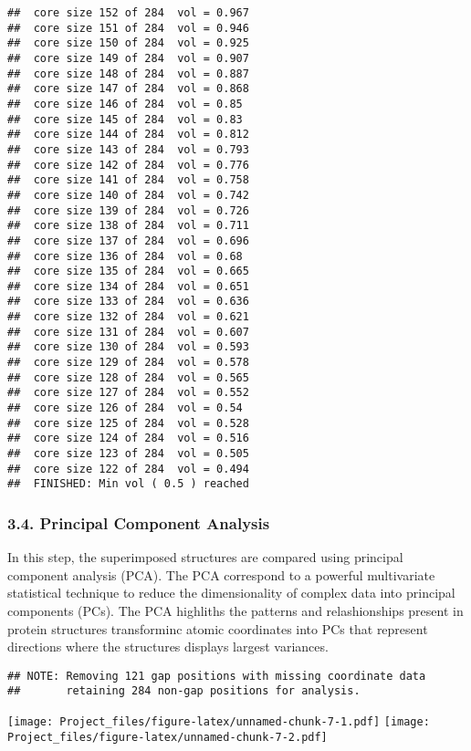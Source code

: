 \documentclass[
]{article}
\begin{document}
\begin{verbatim}
##  core size 152 of 284  vol = 0.967 
##  core size 151 of 284  vol = 0.946 
##  core size 150 of 284  vol = 0.925 
##  core size 149 of 284  vol = 0.907 
##  core size 148 of 284  vol = 0.887 
##  core size 147 of 284  vol = 0.868 
##  core size 146 of 284  vol = 0.85 
##  core size 145 of 284  vol = 0.83 
##  core size 144 of 284  vol = 0.812 
##  core size 143 of 284  vol = 0.793 
##  core size 142 of 284  vol = 0.776 
##  core size 141 of 284  vol = 0.758 
##  core size 140 of 284  vol = 0.742 
##  core size 139 of 284  vol = 0.726 
##  core size 138 of 284  vol = 0.711 
##  core size 137 of 284  vol = 0.696 
##  core size 136 of 284  vol = 0.68 
##  core size 135 of 284  vol = 0.665 
##  core size 134 of 284  vol = 0.651 
##  core size 133 of 284  vol = 0.636 
##  core size 132 of 284  vol = 0.621 
##  core size 131 of 284  vol = 0.607 
##  core size 130 of 284  vol = 0.593 
##  core size 129 of 284  vol = 0.578 
##  core size 128 of 284  vol = 0.565 
##  core size 127 of 284  vol = 0.552 
##  core size 126 of 284  vol = 0.54 
##  core size 125 of 284  vol = 0.528 
##  core size 124 of 284  vol = 0.516 
##  core size 123 of 284  vol = 0.505 
##  core size 122 of 284  vol = 0.494 
##  FINISHED: Min vol ( 0.5 ) reached
\end{verbatim}

\hypertarget{principal-component-analysis}{%
\subsubsection{3.4. Principal Component
Analysis}\label{principal-component-analysis}}

In this step, the superimposed structures are compared using principal
component analysis (PCA). The PCA correspond to a powerful multivariate
statistical technique to reduce the dimensionality of complex data into
principal components (PCs). The PCA highliths the patterns and
relashionships present in protein structures transforminc atomic
coordinates into PCs that represent directions where the structures
displays largest variances.

\begin{verbatim}
## NOTE: Removing 121 gap positions with missing coordinate data
##       retaining 284 non-gap positions for analysis.
\end{verbatim}

\texttt{[image: Project\_files/figure-latex/unnamed-chunk-7-1.pdf]}
\texttt{[image: Project\_files/figure-latex/unnamed-chunk-7-2.pdf]}
\end{document}
